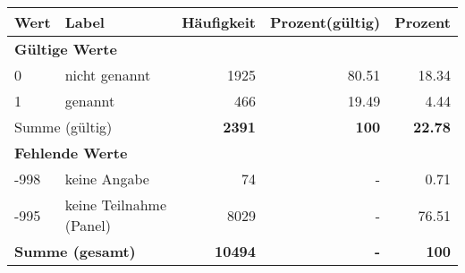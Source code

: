     \begin{longtable}{lXrrr}
     \toprule
     \textbf{Wert} & \textbf{Label} & \textbf{Häufigkeit} & \textbf{Prozent(gültig)} & \textbf{Prozent} \\
     \endhead
     \midrule
     \multicolumn{5}{l}{\textbf{Gültige Werte}}\\

     0 &
     \multicolumn{1}{X}{ nicht genannt   } &


       \num{1925} &
       \num[round-mode=places,round-precision=2]{80,51} &
         \num[round-mode=places,round-precision=2]{18,34} \\

     1 &
     \multicolumn{1}{X}{ genannt   } &


       \num{466} &
       \num[round-mode=places,round-precision=2]{19,49} &
         \num[round-mode=places,round-precision=2]{4,44} \\
     \midrule
     \multicolumn{2}{l}{Summe (gültig)} &
       \textbf{\num{2391}} &
     \textbf{100} &
       \textbf{\num[round-mode=places,round-precision=2]{22,78}} \\
     \multicolumn{5}{l}{\textbf{Fehlende Werte}}\\
       -998 &
       keine Angabe &
         \num{74} &
        - &
         \num[round-mode=places,round-precision=2]{0,71} \\
       -995 &
       keine Teilnahme (Panel) &
         \num{8029} &
        - &
         \num[round-mode=places,round-precision=2]{76,51} \\
     \midrule
     \multicolumn{2}{l}{\textbf{Summe (gesamt)}} &
          \textbf{\num{10494}} &
        \textbf{-} &
        \textbf{100} \\
     \bottomrule
     \end{longtable}
     
